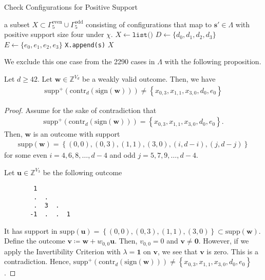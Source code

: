\begin{algorithm}
    \caption{Check Configurations for Positive Support}
    \label{alg:iewjr83h8w9}
    \begin{algorithmic}[1]
    \Ensure a subset \( X \subset \Gamma^{\mathrm{even}}_5 \cup \Gamma^{\mathrm{odd}}_5 \) consisting of configurations that map to \( \mathbf{s}' \in \Lambda \) with positive support size four under \( \chi \).
    \State $X \gets \texttt{list()}$
    \State $D \gets \{d_0, d_1, d_2, d_3\}$
    \State $E \gets \{e_0, e_1, e_2, e_3\}$
            \State \texttt{X.append(s)}
        \EndIf
    \EndFor
    \State \Return \( X \)
\end{algorithmic}
\end{algorithm}

We exclude this one case from the 2290 cases in \( \Lambda \) with the following proposition.

\begin{proposition}
    Let \( d \geq 42 \). Let \( \mathbf{w} \in \mathbb{Z}^{V_d} \) be a weakly valid outcome. Then, we have 
    \begin{align*}
        \mathrm{supp}^+(\mathrm{contr}_d(\mathrm{sign}(\mathbf{w}))) \neq \left\{ x_{0,3}, x_{1,1}, x_{3,0}, d_0, e_0 \right\} 
    \end{align*}
\end{proposition}

\begin{proof}
    Assume for the sake of contradiction that 
    \begin{align*}
        \mathrm{supp}^+(\mathrm{contr}_d(\mathrm{sign}(\mathbf{w}))) = \left\{ x_{0,3}, x_{1,1}, x_{3,0}, d_0, e_0 \right\}.
    \end{align*}
    Then, \( \mathbf{w} \) is an outcome with support 
    \begin{align*}
        \mathrm{supp}(\mathbf{w}) = \left\{ (0,0), (0,3), (1,1), (3,0), (i,d-i), (j, d-j) \right\}
    \end{align*}
    for some even \( i =4,6,8, \dots, d-4 \) and odd \( j = 5,7,9, \dots, d-4 \).

    Let \( \mathbf{u} \in \mathbb{Z}^{V_3} \) be the following outcome 
    \begin{verbatim}
        1
        .  .
        .  3  .
       -1  .  .  1
    \end{verbatim}
    It has support in \( \mathrm{supp}(\mathbf{u}) = \left\{ (0,0), (0,3), (1,1), (3,0) \right\}  \subset  \mathrm{supp}(\mathbf{w})\). Define the outcome \( \mathbf{v} \coloneqq \mathbf{w} +w_{0,0} \mathbf{u} \). Then, \( v_{0,0} = 0 \) and \( \mathbf{v} \neq \mathbf{0} \). However, if we apply the Invertibility Criterion with \( \lambda = \mathbf{1} \) on \( \mathbf{v} \), we see that \( \mathbf{v} \) is zero. This is a contradiction. Hence, \( \mathrm{supp}^+(\mathrm{contr}_d(\mathrm{sign}(\mathbf{w}))) \neq \left\{ x_{0,3}, x_{1,1}, x_{3,0}, d_0, e_0 \right\}  \).
\end{proof}

